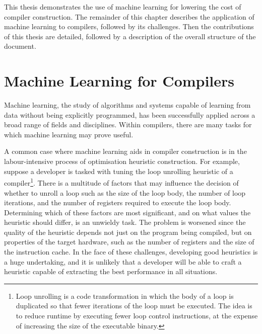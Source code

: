 This thesis demonstrates the use of machine learning for lowering the cost of compiler construction. The remainder of this chapter describes the application of machine learning to compilers, followed by its challenges. Then the contributions of this thesis are detailed, followed by a description of the overall structure of the document.


\section{Machine Learning for Compilers}

Machine learning, the study of algorithms and systems capable of learning from data without being explicitly programmed, has been successfully applied across a broad range of fields and disciplines. Within compilers, there are many tasks for which machine learning may prove useful.

A common case where machine learning aids in compiler construction is in the labour-intensive process of optimisation heuristic construction. For example, suppose a developer is tasked with tuning the loop unrolling heuristic of a compiler\footnote{Loop unrolling is a code transformation in which the body of a loop is duplicated so that fewer iterations of the loop must be executed. The idea is to reduce runtime by executing fewer loop control instructions, at the expense of increasing the size of the executable binary.}. There is a multitude of factors that may influence the decision of whether to unroll a loop such as the size of the loop body, the number of loop iterations, and the number of registers required to execute the loop body. Determining which of these factors are most significant, and on what values the heuristic should differ, is an unwieldy task. The problem is worsened since the quality of the heuristic depends not just on the program being compiled, but on properties of the target hardware, such as the number of registers and the size of the instruction cache. In the face of these challenges, developing good heuristics is a huge undertaking, and it is unlikely that a developer will be able to craft a heuristic capable of extracting the best performance in all situations.

